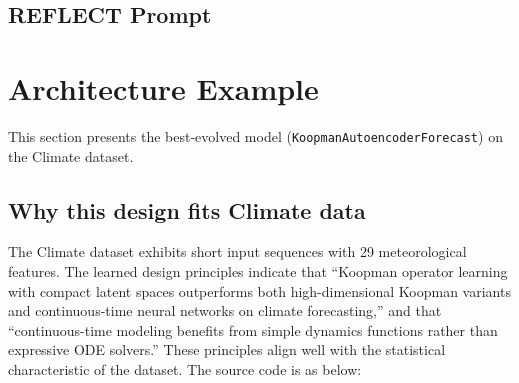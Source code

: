 \subsection{REFLECT Prompt}


\section{Architecture Example}
\label{app:case_study}

This section presents the best-evolved model (\texttt{KoopmanAutoencoderForecast}) on the Climate dataset.

\subsection*{Why this design fits Climate data}

The Climate dataset exhibits short input sequences with 29 meteorological features. The learned design principles indicate that ``Koopman operator learning with compact latent spaces outperforms both high-dimensional Koopman variants and continuous-time neural networks on climate forecasting,'' and that ``continuous-time modeling benefits from simple dynamics functions rather than expressive ODE solvers.'' These principles align well with the statistical characteristic of the dataset. The source code is as below:

